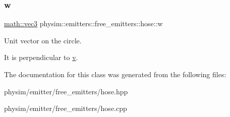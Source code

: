 \subsubsection{\texorpdfstring{w}{w}}
{\footnotesize\ttfamily \hyperlink{structphysim_1_1math_1_1vec3}{math\+::vec3} physim\+::emitters\+::free\+\_\+emitters\+::hose\+::w\hspace{0.3cm}{\ttfamily [protected]}}



Unit vector on the circle. 

It is perpendicular to \hyperlink{classphysim_1_1emitters_1_1free__emitters_1_1hose_a3a849102db9771fe37143abec55f29f7}{v}. 

The documentation for this class was generated from the following files\+:\begin{DoxyCompactItemize}
\item 
physim/emitter/free\+\_\+emitters/hose.\+hpp\item 
physim/emitter/free\+\_\+emitters/hose.\+cpp\end{DoxyCompactItemize}
